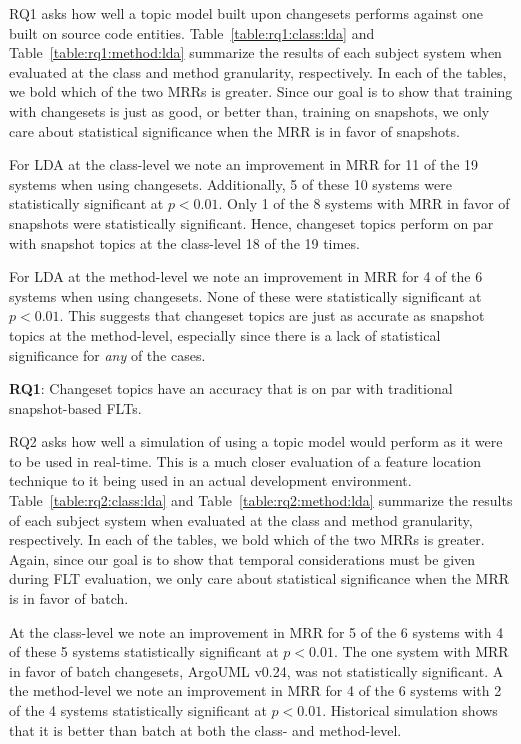 RQ1 asks how well a topic model built upon changesets performs against
one built on source code entities.
Table~\ref{table:rq1:class:lda} and Table~\ref{table:rq1:method:lda}
summarize the results of each subject system when
evaluated at the class and method granularity, respectively.
In each of the tables, we bold which of the two MRRs is greater.
Since our goal is to show that training with changesets is just as good, or
better than, training on snapshots, we only care about statistical significance
when the MRR is in favor of snapshots.

For LDA at the class-level we note an improvement in MRR for 11 of the 19 systems when using changesets.
Additionally, 5 of these 10 systems were statistically significant at $p<0.01$.
Only 1 of the 8 systems with MRR in favor of snapshots were statistically significant.
Hence, changeset topics perform on par with snapshot topics at the class-level 18 of the 19 times.

For LDA at the method-level we note an improvement in MRR for 4 of the 6 systems when using changesets.
None of these were statistically significant at $p<0.01$.
This suggests that changeset topics are just as accurate as snapshot topics at the method-level,
especially since there is a lack of statistical significance for \emph{any} of the cases.

\begin{framed}
    \textbf{RQ1}:
    Changeset topics have an accuracy that is on par with traditional snapshot-based FLTs.
\end{framed}



RQ2 asks how well a simulation of using a topic model would perform as it were to be used in real-time.
This is a much closer evaluation of a feature location technique to it being used in an actual development environment.
Table~\ref{table:rq2:class:lda} and Table~\ref{table:rq2:method:lda}
summarize the results of each subject system when
evaluated at the class and method granularity, respectively.
In each of the tables, we bold which of the two MRRs is greater.
Again, since our goal is to show that temporal considerations must be given
during FLT evaluation, we only care about statistical significance when the MRR
is in favor of batch.

At the class-level we note an improvement in MRR for 5 of the 6 systems
with 4 of these 5 systems statistically significant at $p<0.01$.
The one system with MRR in favor of batch changesets, ArgoUML v0.24, was not statistically significant.
A the method-level we note an improvement in MRR for 4 of the 6 systems
with 2 of the 4 systems statistically significant at $p<0.01$.
Historical simulation shows that it is better than batch at both the class- and method-level.

